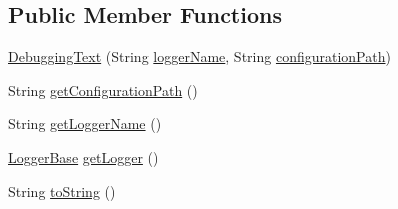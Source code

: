 \subsection*{Public Member Functions}
\begin{DoxyCompactItemize}
\item 
\hyperlink{classit_1_1emarolab_1_1cagg_1_1debugging_1_1DebuggingText_abacb9de3680b33bd0958d429fda5b7ec}{Debugging\-Text} (String \hyperlink{classit_1_1emarolab_1_1cagg_1_1debugging_1_1DebuggingText_afa1175bdb0c7a658affe0b25a8a924c3}{logger\-Name}, String \hyperlink{classit_1_1emarolab_1_1cagg_1_1debugging_1_1DebuggingText_a4e65225034622175b3378a1a7b7c311b}{configuration\-Path})
\item 
String \hyperlink{classit_1_1emarolab_1_1cagg_1_1debugging_1_1DebuggingText_aaeff0ed9d47c673637344f5f738c45eb}{get\-Configuration\-Path} ()
\item 
String \hyperlink{classit_1_1emarolab_1_1cagg_1_1debugging_1_1DebuggingText_affd2ee09ca69d174906069b511a0ef29}{get\-Logger\-Name} ()
\item 
\hyperlink{classit_1_1emarolab_1_1cagg_1_1debugging_1_1DebuggingText_1_1LoggerBase}{Logger\-Base} \hyperlink{classit_1_1emarolab_1_1cagg_1_1debugging_1_1DebuggingText_a27ca62f94655750c25c45e20b76db28b}{get\-Logger} ()
\item 
String \hyperlink{classit_1_1emarolab_1_1cagg_1_1debugging_1_1DebuggingText_a2ac73f1a5ffa5adce0a953500982c85d}{to\-String} ()
\end{DoxyCompactItemize}

